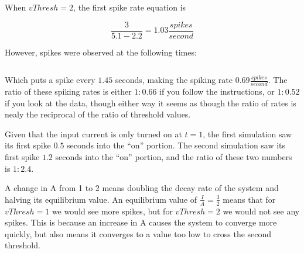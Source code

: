 \documentclass[a4paper,12pt]{article}
\begin{document}
\vspace{2mm}

When $vThresh = 2$, the first spike rate equation is 

\begin{equation}
\frac{3}{5.1-2.2} = 1.03 \frac{spikes}{second}
\end{equation}

However, spikes were observed at the following times:

\begin{equation}
[ 2.2, 3.65, 5.1 ]
\end{equation}

Which puts a spike every $1.45$ seconds, making the spiking rate $0.69 \frac{spikes}{second}$. The ratio of these spiking rates is either $1:0.66$ if you follow the instructions, or $1:0.52$ if you look at the data, though either way it seems as though the ratio of rates is nealy the reciprocal of the ratio of threshold values. 

\vspace{2mm}

Given that the input current is only turned on at $t=1$, the first simulation saw its first spike $0.5$ seconds into the ``on'' portion. The second simulation saw its first spike $1.2$ seconds into the ``on'' portion, and the ratio of these two numbers is $1:2.4$. 

\vspace{2mm}

A change in A from 1 to 2 means doubling the decay rate of the system and halving its equilibrium value. An equilibrium value of $\frac{I}{A} = \frac{3}{2}$ means that for $vThresh = 1$ we would see more spikes, but for $vThresh = 2$ we would not see any spikes. This is because an increase in A causes the system to converge more quickly, but also means it converges to a value too low to cross the second threshold. 
\end{document}
